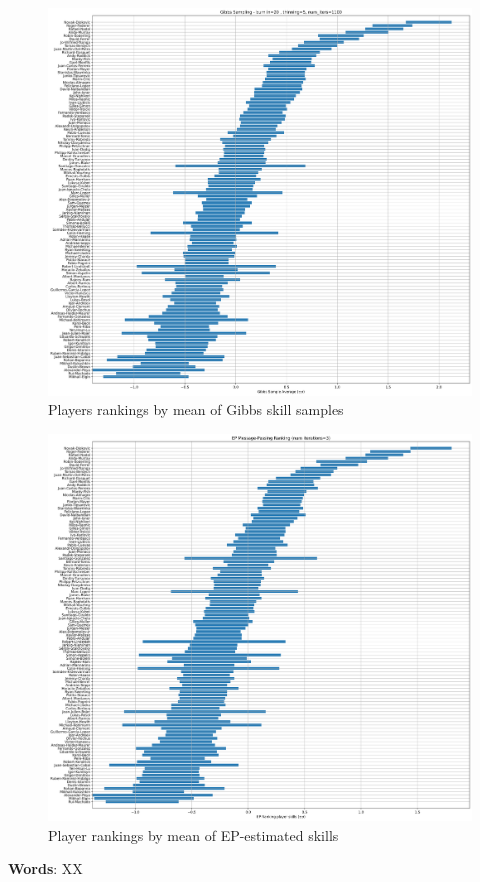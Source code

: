 \documentclass[]{article}
\begin{document}
\begin{figure}[!h]
	\centering
	\includegraphics[width=\linewidth]{gibbs-ranking.png}
	\caption{Players rankings by mean of Gibbs skill samples}
	\label{fig:gibbs-ranking}
\end{figure}

\begin{figure}[!h]
	\centering
	\includegraphics[width=\linewidth]{ep-ranking.png}
	\caption{Player rankings by mean of EP-estimated skills}
	\label{fig:ep-ranking}
\end{figure}

\textbf{Words}: XX
\end{document}
